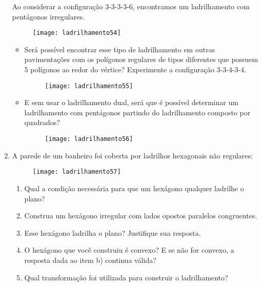 \begin{enumerate}
Ao considerar a configuração 3-3-3-3-6, encontramos um ladrilhamento com pentágonos irregulares.

\begin{figure}[H]
	\centering
	\texttt{[image: ladrilhamento54]}

\end{figure}

\begin{itemize}


\item Será possível encontrar esse tipo de ladrilhamento em outras pavimentações com os polígonos regulares de tipos diferentes que possuem 5 polígonos ao redor do vértice? 	Experimente a configuração 3-3-4-3-4.

	\begin{figure}[H]
	\centering
	\texttt{[image: ladrilhamento55]}

	\end{figure}

\item 	E sem usar o ladrilhamento dual, será que é possível determinar um ladrilhamento com pentágonos partindo do ladrilhamento composto por quadrados?

	\begin{figure}[H]
	\centering
	\texttt{[image: ladrilhamento56]}

	\end{figure}

\end{itemize}


\item  A parede de um banheiro foi coberta por ladrilhos hexagonais não regulares:

	\begin{figure}[H]
	\centering
	\texttt{[image: ladrilhamento57]}

	\end{figure}
	\begin{enumerate}
		\item Qual a condição necessária para que um hexágono qualquer ladrilhe o plano?
		\item Construa um hexágono irregular com lados opostos paralelos congruentes.
		\item Esse hexágono ladrilha o plano? Justifique sua resposta.
		\item O hexágono que você construiu é convexo? E se não for convexo, a resposta dada ao item b) continua válida?
		\item Qual transformação foi utilizada para construir o ladrilhamento?
	\end{enumerate}
	

\end{enumerate}
